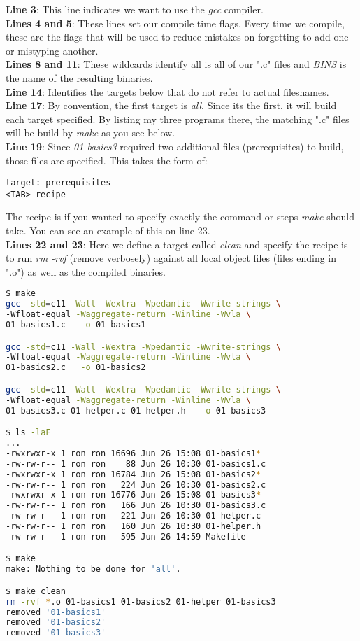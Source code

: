 \documentclass[../main.tex]{subfiles}
\begin{document}
\textbf{Line 3}: This line indicates we want to use the \textit{gcc} compiler.\\
\textbf{Lines 4 and 5}: These lines set our compile time flags.  Every time we compile, these are the flags that will be used to reduce mistakes on forgetting to add one or mistyping another.\\
\textbf{Lines 8 and 11}: These wildcards identify all is all of our ".c" files and \textit{BINS} is the name of the resulting binaries.\\
\textbf{Line 14}: Identifies the targets below that do not refer to actual filesnames.\\
\textbf{Line 17}: By convention, the first target is \textit{all}.  Since its the first, it will build each target specified.  By listing my three programs there, the matching ".c" files will be build by \textit{make} as you see below.\\
\textbf{Line 19}: Since \textit{01-basics3} required two additional files (prerequisites) to build, those files are specified.  This takes the form of:

\begin{verbatim}
target: prerequisites
<TAB> recipe
\end{verbatim}
The recipe is if you wanted to specify exactly the command or steps \textit{make} should take.  You can see an example of this on line 23.\\
\textbf{Lines 22 and 23}: Here we define a target called \textit{clean} and specify the recipe is to run \textit{rm -rvf} (remove verbosely) against all local object files (files ending in ".o") as well as the compiled binaries.\\
\begin{lstlisting}[language=bash]
$ make
gcc -std=c11 -Wall -Wextra -Wpedantic -Wwrite-strings \
-Wfloat-equal -Waggregate-return -Winline -Wvla \
01-basics1.c   -o 01-basics1

gcc -std=c11 -Wall -Wextra -Wpedantic -Wwrite-strings \
-Wfloat-equal -Waggregate-return -Winline -Wvla \
01-basics2.c   -o 01-basics2

gcc -std=c11 -Wall -Wextra -Wpedantic -Wwrite-strings \
-Wfloat-equal -Waggregate-return -Winline -Wvla \
01-basics3.c 01-helper.c 01-helper.h   -o 01-basics3

$ ls -laF
...
-rwxrwxr-x 1 ron ron 16696 Jun 26 15:08 01-basics1*
-rw-rw-r-- 1 ron ron    88 Jun 26 10:30 01-basics1.c
-rwxrwxr-x 1 ron ron 16784 Jun 26 15:08 01-basics2*
-rw-rw-r-- 1 ron ron   224 Jun 26 10:30 01-basics2.c
-rwxrwxr-x 1 ron ron 16776 Jun 26 15:08 01-basics3*
-rw-rw-r-- 1 ron ron   166 Jun 26 10:30 01-basics3.c
-rw-rw-r-- 1 ron ron   221 Jun 26 10:30 01-helper.c
-rw-rw-r-- 1 ron ron   160 Jun 26 10:30 01-helper.h
-rw-rw-r-- 1 ron ron   595 Jun 26 14:59 Makefile

$ make
make: Nothing to be done for 'all'.

$ make clean
rm -rvf *.o 01-basics1 01-basics2 01-helper 01-basics3
removed '01-basics1'
removed '01-basics2'
removed '01-basics3'
\end{lstlisting}
\end{document}
